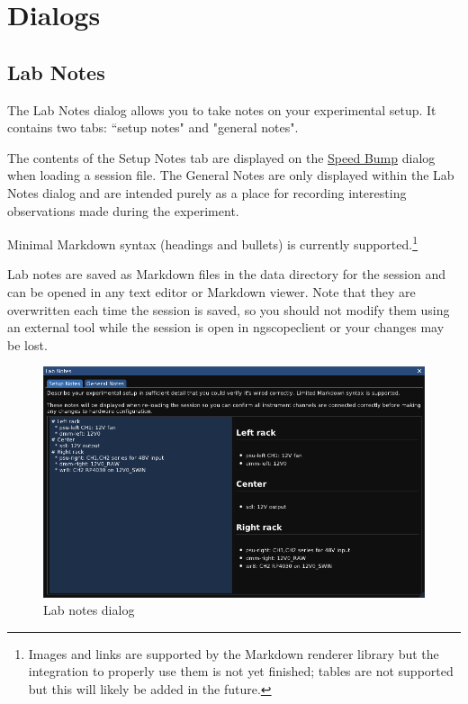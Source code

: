 \chapter{Dialogs}
\label{sec:dialogs}


\section{Lab Notes}
\label{dlg:labnotes}

The Lab Notes dialog allows you to take notes on your experimental setup. It contains two tabs: ``setup notes"
and "general notes".

The contents of the Setup Notes tab are displayed on the \hyperref[dlg:speedbump]{Speed Bump} dialog when loading a
session file. The General Notes are only displayed within the Lab Notes dialog and are intended purely as a place for
recording interesting observations made during the experiment.

Minimal Markdown syntax (headings and bullets) is currently supported.\footnote{Images and links are supported by the
Markdown renderer library but the integration to properly use them is not yet finished; tables are not supported but
this will likely be added in the future.}

Lab notes are saved as Markdown files in the data directory for the session and can be opened in any
text editor or Markdown viewer. Note that they are overwritten each time the session is saved, so you should not modify
them using an external tool while the session is open in ngscopeclient or your changes may be lost.

\begin{figure}[H]
\centering
\includegraphics[width=12cm]{ng-images/dialog-labnotes.png}
\caption{Lab notes dialog}
\label{fig:labnotes}
\end{figure}


